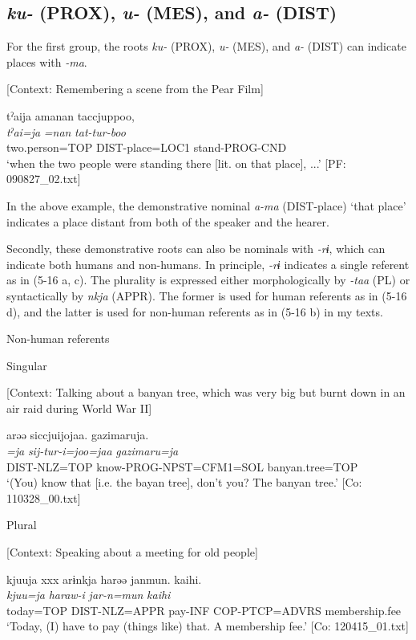 \subsection{\textit{ku-} (PROX), \textit{u-} (MES), and \textit{a-} (DIST)}
\label{sec:key:5.2.1}
For the first group, the roots \textit{ku-} (PROX), \textit{u-} (MES), and \textit{a-} (DIST) can indicate places with \textit{{}-ma}.

\ea \label{ex:5:15}   [Context: Remembering a scene from the Pear Film]

\glll  tˀaija  amanan  taccjuppoo,\\
\textit{tˀai=ja}  \textit{=nan}  \textit{tat-tur-boo}\\
two.person=TOP  DIST-place=LOC1  stand-PROG-CND\\
\glt ‘when the two people were standing there [lit. on that place], ...’ [PF: 090827\_02.txt]
\z

In the above example, the demonstrative nominal \textit{a-ma} (DIST-place) ‘that place’ indicates a place distant from both of the speaker and the hearer.

Secondly, these demonstrative roots can also be nominals with \textit{{}-rɨ}, which can indicate both humans and non-humans. In principle, \textit{{}-rɨ} indicates a single referent as in (5-16 a, c). The plurality is expressed either morphologically by \textit{{}-taa} (PL) or syntactically by \textit{nkja} (APPR). The former is used for human referents as in (5-16 d), and the latter is used for non-human referents as in (5-16 b) in my texts.

\ea \label{ex:5:16}   Non-human referents

 \ea \label{ex:5:16a} Singular

    [Context: Talking about a banyan tree, which was very big but burnt down in an air raid during World War II]

\glll  arəə  siccjuijojaa.  gazimaruja.\\
\textit{=ja}  \textit{sij-tur-i=joo=jaa}  \textit{gazimaru=ja}\\
DIST-NLZ=TOP  know-PROG-NPST=CFM1=SOL  banyan.tree=TOP\\
\glt ‘(You) know that [i.e. the bayan tree], don’t you? The banyan tree.’ [Co: 110328\_00.txt]

 \ex \label{ex:5:b} Plural

    [Context: Speaking about a meeting for old people]

\glll  kjuuja  xxx  arɨnkja  harəə  janmun.   {\textbar}kaihi{\textbar}.\\
\textit{kjuu=ja}    \textit{}  \textit{haraw-i}  \textit{jar-n=mun}   \textit{kaihi}\\
today=TOP    DIST-NLZ=APPR  pay-INF  COP-PTCP=ADVRS   membership.fee\\
\glt ‘Today, (I) have to pay (things like) that. A membership fee.’ [Co: 120415\_01.txt]

